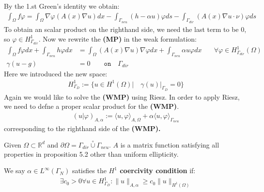 By the 1.st Green's identity we obtain:
\begin{align*}
	\int_\Omega f\varphi = \int_\Omega \nabla \varphi( A(x)\nabla u )dx - \int_{\Gamma_{neu}} (h - \alpha u)\varphi ds - 
	\int_{\Gamma_{dir}} (A(x)\nabla u \cdot \nu)\varphi ds 
\end{align*}
To obtain an scalar product on the righthand side, we need the last term to be 0, so $\varphi \in H^1_{\Gamma_{dir}}$. Now we rewrite the \textbf{(MP)} in the weak formulation: 
\begin{equation}
\begin{aligned}
	\int_{\Omega}f\varphi dx + \int_{\Gamma_{neu}} h\varphi dx &= \int_\Omega(A(x) \nabla u)\nabla\varphi dx + \int_{\Gamma_{neu}} \alpha u \varphi dx
	\quad &\forall \varphi \in H^1_{\Gamma_{dir}}(\Omega)\\
	\gamma(u - g) &= 0 \qquad  \texttt{on} \quad \Gamma_{dir}
\end{aligned}
\end{equation}
Here we introduced the new space:
\begin{align*}
	H^1_{\Gamma_D}:= \{u \in H^1(\Omega) |\quad \gamma(u)|_{\Gamma_D} = 0\}
\end{align*}
Again we would like to solve the \textbf{(WMP) }using Riesz. In order to apply Riesz, we need to defne a proper scalar product for the \textbf{(WMP)}.
\begin{align*}
	( u| \varphi )_{A, \alpha}:= \langle u, \varphi \rangle_{A, \Omega} + \alpha \langle u, \varphi \rangle_{\Gamma_{neu}}
\end{align*}
corresponding to the righthand side of the \textbf{(WMP).}

\begin{definition}[$H^1$ coecivity]
Given $\Omega \subset \mathbb{R}^d$ and $\partial \Omega = \Gamma_{dir} \overset{\circ}{\cup} \Gamma_{neu}$. $A$ is a matrix function satisfying all properties in proposition 5.2 other than uniform ellipticity.\par 
We say $\alpha \in L^\infty(\Gamma_N)$ satisfies the \textbf{$H^1$ coercivity condition} if:
\begin{align*}
	\exists c_0 > 0 \forall u \in H^1_{\Gamma_D}: \|u\|_{A, \alpha} \geq c_0 \|u\|_{H^1(\Omega)}
\end{align*}
\end{definition}

